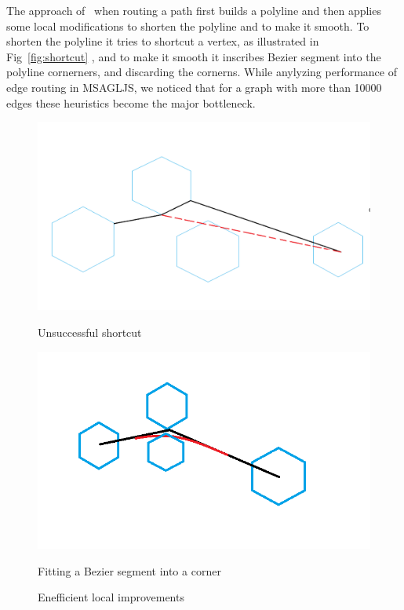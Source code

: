 \documentclass{gd-llncs}
\begin{document}
The approach of~\cite{dwyer2010fast} when routing a path first builds a polyline and then applies some local modifications to shorten the polyline and to make it smooth. To shorten the polyline it tries to shortcut a vertex, as illustrated in Fig~\ref{fig:shortcut} , and to make it smooth it inscribes Bezier segment into the polyline cornerners, and discarding the cornerns. While anylyzing performance of edge routing in MSAGLJS, we noticed that for a graph with more than 10000 edges these heuristics become the major bottleneck. 
\begin{figure}[!tbp]
  \centering
  \begin{minipage}[b]{0.4\textwidth}
    \includegraphics[width=\textwidth]{./naive_shorcut_now_working.png}
    
    \caption{Unsuccessful shortcut}
  \end{minipage}
  \hfill
  \begin{minipage}[b]{0.4\textwidth}
    \includegraphics[width=\textwidth]{fillet_corner.png}
    \caption{Fitting a Bezier segment into a corner}
  \end{minipage}
  \caption*{Enefficient local improvements}  
\end{figure}
\end{document}
